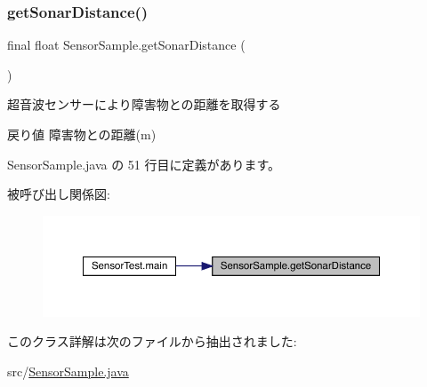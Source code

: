 \subsubsection{\texorpdfstring{getSonarDistance()}{getSonarDistance()}}
{\footnotesize\ttfamily final float Sensor\+Sample.\+get\+Sonar\+Distance (\begin{DoxyParamCaption}{ }\end{DoxyParamCaption})\hspace{0.3cm}{\ttfamily [inline]}}

超音波センサーにより障害物との距離を取得する \begin{DoxyReturn}{戻り値}
障害物との距離(m) 
\end{DoxyReturn}


 Sensor\+Sample.\+java の 51 行目に定義があります。

被呼び出し関係図\+:
\nopagebreak
\begin{figure}[H]
\begin{center}
\leavevmode
\includegraphics[width=350pt]{d1/d8a/class_sensor_sample_ac79200df350ed399b1a7ef2ea0285d69_icgraph}
\end{center}
\end{figure}


このクラス詳解は次のファイルから抽出されました\+:\begin{DoxyCompactItemize}
\item 
src/\mbox{\hyperlink{_sensor_sample_8java}{Sensor\+Sample.\+java}}\end{DoxyCompactItemize}
